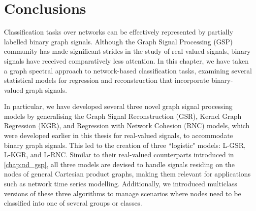 \section{Conclusions}

Classification tasks over networks can be effectively represented by partially labelled binary graph signals. Although the Graph Signal Processing (GSP) community has made significant strides in the study of real-valued signals, binary signals have received comparatively less attention. In this chapter, we have taken a graph spectral approach to network-based classification tasks, examining several statistical models for regression and reconstruction that incorporate binary-valued graph signals.

In particular, we have developed several three novel graph signal processing models by generalising the Graph Signal Reconstruction (GSR), Kernel Graph Regression (KGR), and Regression with Network Cohesion (RNC) models, which were developed earlier in this thesis for real-valued signals, to accommodate binary graph signals. This led to the creation of three ``logistic" models: L-GSR, L-KGR, and L-RNC. Similar to their real-valued counterparts introduced in \cref{chap:nd_gsp}, all three models are devised to handle signals residing on the nodes of general Cartesian product graphs, making them relevant for applications such as network time series modelling. Additionally, we introduced multiclass versions of these three algorithms to manage scenarios where nodes need to be classified into one of several groups or classes. 

